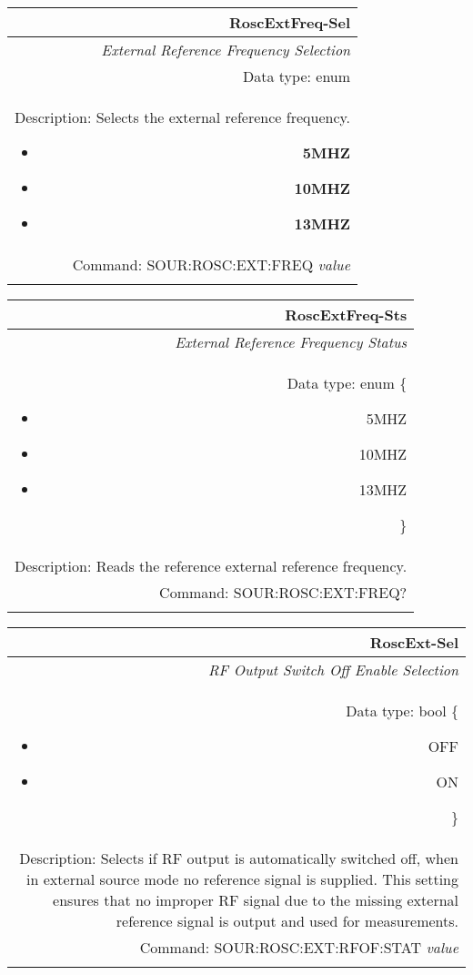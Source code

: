 \documentclass[openany]{article}
\begin{document}
		\begin{tabular}{N}
			\hline
			\bfseries RoscExtFreq-Sel \\ \hline
			\emph{External Reference Frequency Selection} \\
			Data type: enum \\   
			Description: Selects the external reference frequency.\begin{itemize}[noitemsep]
				\small
				\item[] \textbf{5MHZ}
                                \item[] \textbf{10MHZ}
				\item[] \textbf{13MHZ}

			\end{itemize} \\
			Command: SOUR:ROSC:EXT:FREQ \emph{value} \\
			\\

		\end{tabular}


		\begin{tabular}{N}
			\hline
			\bfseries RoscExtFreq-Sts \\ \hline
			\emph{External Reference Frequency Status} \\
			Data type: enum \{\begin{itemize}[noitemsep]
				\small
				\item[] 5MHZ
				\item[] 10MHZ
				\item[] 13MHZ
			\end{itemize}\} \\ 
			Description: Reads the reference external reference frequency. \\
			Command: SOUR:ROSC:EXT:FREQ? \\
			\\

		\end{tabular}


		\begin{tabular}{N}
			\hline
			\bfseries RoscExt-Sel \\ \hline
			\emph{RF Output Switch Off Enable Selection} \\
			Data type: bool \{\begin{itemize}[noitemsep]
				\small
				\item[] OFF
				\item[] ON
			\end{itemize}\} \\
			Description: Selects if RF output is automatically switched off, when in external source mode no reference signal is supplied. This setting ensures that no improper RF signal due to the missing external reference signal is output and used for measurements. \\
			Command: SOUR:ROSC:EXT:RFOF:STAT \emph{value} \\
			\\

		\end{tabular}
\end{document}
